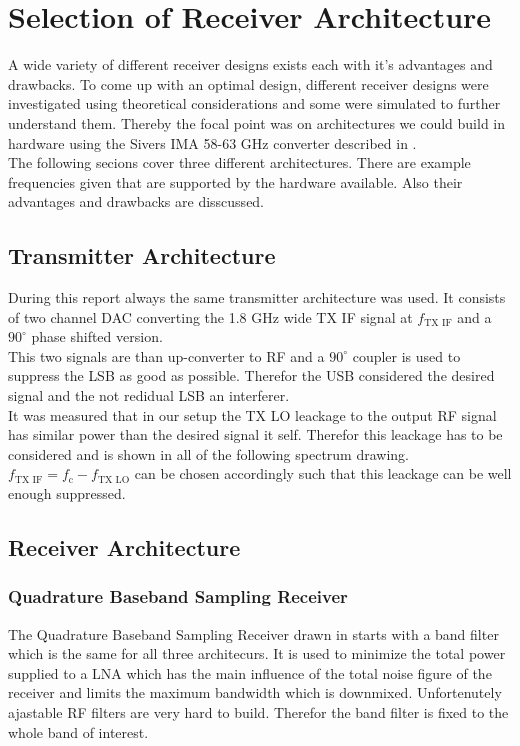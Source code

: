 \chapter{Selection of Receiver Architecture}
\label{chap:rx}

A wide variety of different receiver designs exists each with it's advantages
and drawbacks. To come up with an optimal design, different receiver designs
were investigated using theoretical considerations and some were simulated to
further understand them. Thereby the focal point was on architectures we could
build in hardware using the Sivers IMA 58-63 GHz converter described in
. \\

The following secions cover three different architectures. There are example
frequencies given that are supported by the hardware available. Also their
advantages and drawbacks are disscussed.

\section{Transmitter Architecture}
During this report always the same transmitter architecture was used.
It consists of two channel \gls{DAC} converting the 1.8 GHz wide
\gls{TX} \gls{IF} signal at $f_{\text{TX IF}}$ and a $90^\circ$ phase shifted
version. \\

This two signals are than up-converter to
\gls{RF} and a $90^\circ$ coupler is used to suppress the \gls{LSB}
as good as possible.
Therefor the \gls{USB} considered the desired signal and the
not redidual \gls{LSB} an interferer. \\

It was measured that in our setup the \gls{TX} \gls{LO} leackage
to the output \gls{RF} signal has similar power than the desired
signal it self. Therefor this leackage has to be considered and is
shown in all of the following spectrum drawing.
$f_{\text{TX IF}} = f_{\text{c}} - f_{\text{TX LO}}$ can be chosen accordingly
such that this leackage can be well enough suppressed.

\section{Receiver Architecture}
\subsection{Quadrature Baseband Sampling Receiver}
The Quadrature Baseband Sampling Receiver drawn in 
starts with a band filter which is the same for all three architecurs.
It is used to minimize the total power supplied to a \gls{LNA}
which has the main influence of the total noise figure of the receiver
and limits the maximum bandwidth which is downmixed.
Unfortenutely ajastable \gls{RF} filters are very hard to build. Therefor
the band filter is fixed to the whole band of interest. \\


